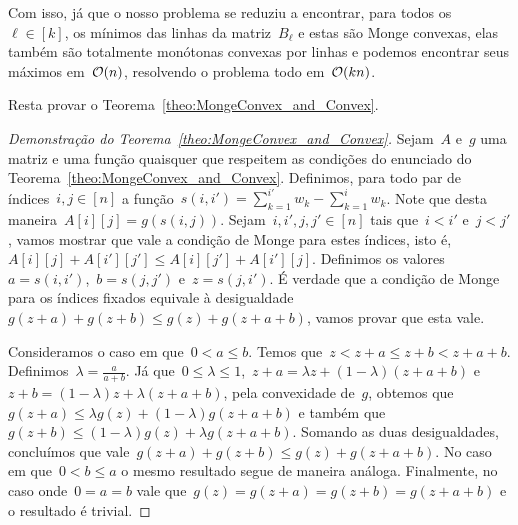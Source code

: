 Com isso, já que o nosso problema se reduziu a encontrar, para todos os~$\ell \in [k]$, os mínimos das linhas da matriz~$B_\ell$ e estas são Monge convexas, elas também são totalmente monótonas convexas por linhas e podemos encontrar seus máximos em~$\mathcal{O}(n)$, resolvendo o problema todo em~$\mathcal{O}(kn)$.

Resta provar o Teorema~\ref{theo:MongeConvex_and_Convex}.

\begin{proof}[Demonstração do Teorema~\ref{theo:MongeConvex_and_Convex}]
Sejam~$A$ e~$g$ uma matriz e uma função quaisquer que respeitem as condições do enunciado do Teorema~\ref{theo:MongeConvex_and_Convex}. Definimos, para todo par de índices~${ i,j \in [n] }$ a função~${ s(i,i') = \sum\limits_{k=1}^{i'} w_k - \sum\limits_{k=1}^i w_k }$. Note que desta maneira~${ A[i][j] = g(s(i,j)) }$. Sejam~${ i,i',j,j' \in [n] }$ tais que~${ i < i' }$ e~${ j < j' }$, vamos mostrar que vale a condição de Monge para estes índices, isto é,~${ A[i][j] + A[i'][j'] \leq A[i][j'] + A[i'][j] }$. Definimos os valores~${ a = s(i,i') }$,~${ b = s(j,j') }$ e~${ z = s(j,i') }$. É verdade que a condição de Monge para os índices fixados equivale à desigualdade~${ g(z+a) + g(z+b) \leq g(z) + g(z+a+b) }$, vamos provar que esta vale.

Consideramos o caso em que~${ 0 < a \leq b }$. Temos que~${ z < z+a \leq z + b < z + a + b }$. Definimos~${ \lambda = \frac{a}{a+b} }$. Já que~${ 0 \leq \lambda \leq 1 }$,~${ z + a = \lambda z + (1 - \lambda)(z+a+b) }$ e~${ z + b = (1 - \lambda)z + \lambda(z+a+b) }$, pela convexidade de~$g$, obtemos que~${ g(z+a) \leq \lambda g(z) + (1 - \lambda)g(z+a+b) }$ e também que~${ g(z+b) \leq (1-\lambda) g(z) + \lambda g(z+a+b) }$. Somando as duas desigualdades, concluímos que vale~${ g(z+a) + g(z+b) \leq g(z) + g(z+a+b) }$. No caso em que~${ 0 < b \leq a }$ o mesmo resultado segue de maneira análoga. Finalmente, no caso onde~${ 0 = a = b }$ vale que~${ g(z) = g(z+a) = g(z+b) = g(z+a+b) }$ e o resultado é trivial.
\end{proof}
